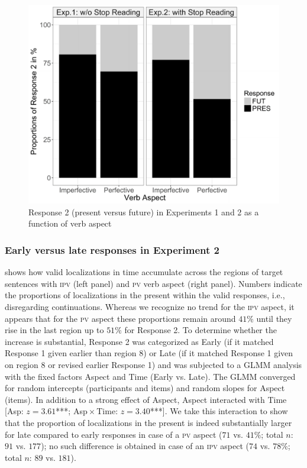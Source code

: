 \documentclass[output=paper,colorlinks,citecolor=brown,newtxmath,hidelinks]{langscibook}
\begin{document}
\begin{figure}
\includegraphics[height=.4\textheight]{figures/06gattnar_etal_fig1.pdf}
\caption{Response 2 (present versus future) in Experiments 1 and 2 as a function of verb aspect}
\label{fig:eins}
\end{figure}

\subsubsection{Early versus late responses in Experiment 2}

 shows how valid localizations in time accumulate across the regions of target sentences with \textsc{ipv} (left panel) and \textsc{pv} verb aspect (right panel). Numbers indicate the proportions of localizations in the present within the valid responses, i.e., disregarding continuations. Whereas we recognize no trend for the \textsc{ipv} aspect, it appears that for the \textsc{pv} aspect these proportions remain around $41\%$ until they rise in the last region up to $51\%$ for Response 2. To determine whether the increase is substantial, Response 2 was categorized as Early (if it matched Response 1 given earlier than region 8) or Late (if it matched Response 1 given on region 8 or revised earlier Response 1) and was subjected to a GLMM analysis with the fixed factors Aspect and Time (Early vs. Late). The GLMM converged for random intercepts (participants and items) and random slopes for Aspect (items). In addition to a strong effect of Aspect, Aspect interacted with Time [Asp: $z=3.61$\textup{***}; Asp${}\times{}$Time: $z=3.40$\textup{***}]. We take this interaction to show that the proportion of localizations in the present is indeed substantially larger for late compared to early responses in case of a \textsc{pv} aspect ($71$ vs. $41\%$; total $n$: $91$ vs. $177$); no such difference is obtained in case of an \textsc{ipv} aspect ($74$ vs. $78\%$; total $n$: $89$ vs. $181$).
\end{document}
